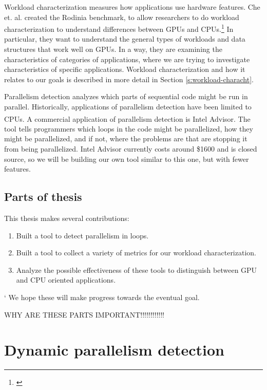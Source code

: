 \documentclass[12pt,twoside]{reedthesis}
\begin{document}
		Workload characterization measures how applications use hardware features. Che et. al. created the Rodinia benchmark, to allow researchers to do workload characterization to understand differences between GPUs and CPUs.\footnote{\cite{Che:2010}} In particular, they want to understand the general types of workloads and data structures that work well on GPUs. In a way, they are examining the characteristics of categories of applications, where we are trying to investigate characteristics of specific applications. Workload characterization and how it relates to our goals is described in more detail in Section \ref{s:workload-characht}. 
		
		Parallelism detection analyzes which parts of sequential code might be run in parallel. Historically, applications of parallelism detection have been limited to CPUs. 
		A commercial application of parallelism detection is Intel\textsuperscript{\textregistered} Advisor. The tool tells programmers which loops in the code might be parallelized, how they might be parallelized, and if not, where the problems are that are stopping it from being parallelized. 
		Intel Advisor currently costs around \$1600 and is closed source, so we will be building our own tool similar to this one, but with fewer features. 
		
	
	\section{Parts of thesis}
	
		This thesis makes several contributions:
		
		\begin{enumerate}
			\item Built a tool to detect parallelism in loops. 
			\item Built a tool to collect a variety of metrics for our workload characterization. %
			\item Analyze the possible effectiveness of these tools to distinguish between GPU and CPU oriented applications.
		\end{enumerate}
	
	`	We hope these will make progress towards the eventual goal.
	
		WHY ARE THESE PARTS IMPORTANT!!!!!!!!!!!!
	
		
\chapter{Dynamic parallelism detection}
\end{document}
